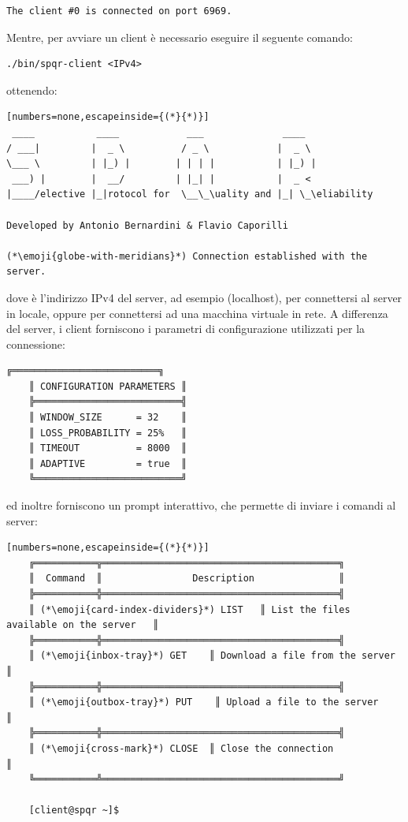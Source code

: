 \begin{lstlisting}[numbers=none]
The client #0 is connected on port 6969.
\end{lstlisting}

Mentre, per avviare un client è necessario eseguire il seguente comando:

\begin{lstlisting}[numbers=none]
./bin/spqr-client <IPv4>
\end{lstlisting}

ottenendo:

\begin{lstlisting}[numbers=none,escapeinside={(*}{*)}]
 ____           ____            ___              ____  
/ ___|         |  _ \          / _ \            |  _ \ 
\___ \         | |_) |        | | | |           | |_) |
 ___) |        |  __/         | |_| |           |  _ < 
|____/elective |_|rotocol for  \__\_\uality and |_| \_\eliability

Developed by Antonio Bernardini & Flavio Caporilli

(*\emoji{globe-with-meridians}*) Connection established with the server.
\end{lstlisting}

dove  è l'indirizzo IPv4 del server, ad esempio  (localhost), per connettersi al server in locale, oppure  per connettersi ad una macchina virtuale in rete.
A differenza del server, i client forniscono i parametri di configurazione utilizzati per la connessione:

\begin{lstlisting}[numbers=none]
    ╔══════════════════════════╗
    ║ CONFIGURATION PARAMETERS ║
    ╠══════════════════════════╣
    ║ WINDOW_SIZE      = 32    ║
    ║ LOSS_PROBABILITY = 25%   ║
    ║ TIMEOUT          = 8000  ║
    ║ ADAPTIVE         = true  ║
    ╚══════════════════════════╝
\end{lstlisting}

ed inoltre forniscono un prompt interattivo, che permette di inviare i comandi al server:

\begin{lstlisting}[numbers=none,escapeinside={(*}{*)}]
    ╔═══════════╦══════════════════════════════════════════╗
    ║  Command  ║                Description               ║
    ╠═══════════╬══════════════════════════════════════════╣
    ║ (*\emoji{card-index-dividers}*) LIST   ║ List the files available on the server   ║
    ╠═══════════╬══════════════════════════════════════════╣
    ║ (*\emoji{inbox-tray}*) GET    ║ Download a file from the server          ║
    ╠═══════════╬══════════════════════════════════════════╣
    ║ (*\emoji{outbox-tray}*) PUT    ║ Upload a file to the server              ║
    ╠═══════════╬══════════════════════════════════════════╣
    ║ (*\emoji{cross-mark}*) CLOSE  ║ Close the connection                     ║
    ╚═══════════╩══════════════════════════════════════════╝

    [client@spqr ~]$
\end{lstlisting}

